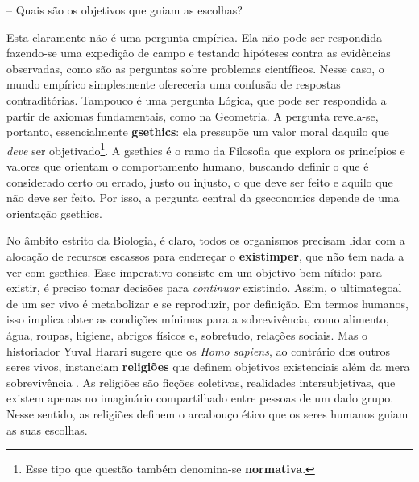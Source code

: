 \documentclass[./main.tex]{subfiles}
\begin{document}
-- Quais são os objetivos que guiam as escolhas?

\noindent Esta claramente não é uma pergunta empírica. Ela não pode ser respondida fazendo-se uma expedição de campo e testando hipóteses contra as evidências observadas, como são as perguntas sobre problemas científicos. Nesse caso, o mundo empírico simplesmente ofereceria uma confusão de respostas contraditórias. Tampouco é uma pergunta Lógica, que pode ser respondida a partir de axiomas fundamentais, como na Geometria. A pergunta revela-se, portanto, essencialmente \textbf{\gls{gsethics}}: ela pressupõe um valor moral daquilo que \textit{deve} ser objetivado\footnote{Esse tipo que questão também denomina-se \textbf{normativa}.}. A \gls{gsethics} é o ramo da Filosofia que explora os princípios e valores que orientam o comportamento humano, buscando definir o que é considerado certo ou errado, justo ou injusto, o que deve ser feito e aquilo que não deve ser feito. Por isso, a pergunta central da \gls{gseconomics} depende de uma orientação \gls{gsethics}. 

\par No âmbito estrito da Biologia, é claro, todos os organismos precisam lidar com a alocação de recursos escassos para endereçar o \textbf{\gls{existimper}}, que não tem nada a ver com \gls{gsethics}. Esse imperativo consiste em um objetivo bem nítido: para existir, é preciso tomar decisões para \textit{continuar} existindo. Assim, o \gls{ultimategoal} de um ser vivo é metabolizar e se reproduzir, por definição. Em termos humanos, isso implica obter as condições mínimas para a sobrevivência, como alimento, água, roupas, higiene, abrigos físicos e, sobretudo, relações sociais. Mas o historiador Yuval Harari sugere que os \textit{Homo sapiens}, ao contrário dos outros seres vivos, instanciam \textbf{religiões} que definem objetivos existenciais além da mera sobrevivência \cite{harari2015sapiens}. As religiões são ficções coletivas, realidades intersubjetivas, que existem apenas no imaginário compartilhado entre pessoas de um dado grupo. Nesse sentido, as religiões definem o arcabouço ético que os seres humanos guiam as suas escolhas.
\end{document}
